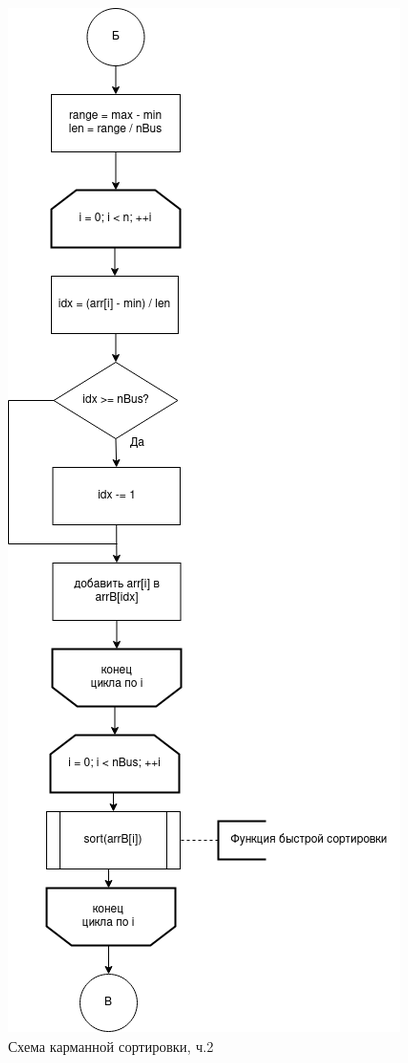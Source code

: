 \documentclass[12pt]{report}
\begin{document}
	\begin{figure}[H]
		\centering
		\includegraphics[width=0.5\linewidth]{bucket_2}
		\caption{Схема карманной сортировки, ч.2}
		\label{fig:schema_bucket_2}
	\end{figure}
	
\end{document}
